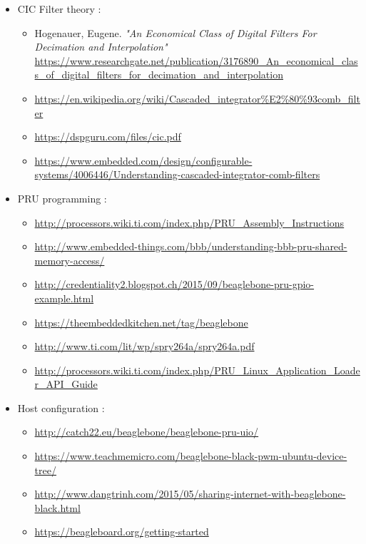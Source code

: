 \documentclass[]{report}
\providecommand{\tightlist}{%
	\setlength{\itemsep}{0pt}\setlength{\parskip}{0pt}}
\begin{document}
\begin{itemize}
\tightlist
\item
  CIC Filter theory :
  
  

  \begin{itemize}
  \tightlist
  \item
    Hogenauer, Eugene. \emph{"An Economical Class of Digital Filters
    For Decimation and Interpolation"} \url{https://www.researchgate.net/publication/3176890_An_economical_class_of_digital_filters_for_decimation_and_interpolation}
  \item
    \url{https://en.wikipedia.org/wiki/Cascaded_integrator%E2%80%93comb_filter}
  \item
    \url{https://dspguru.com/files/cic.pdf}
  \item
    \url{https://www.embedded.com/design/configurable-systems/4006446/Understanding-cascaded-integrator-comb-filters}
  \end{itemize}
\item
  PRU programming :

  \begin{itemize}
  \tightlist
  \item
    \url{http://processors.wiki.ti.com/index.php/PRU\_Assembly\_Instructions}
  \item
    \url{http://www.embedded-things.com/bbb/understanding-bbb-pru-shared-memory-access/}
  \item
    \url{http://credentiality2.blogspot.ch/2015/09/beaglebone-pru-gpio-example.html}
  \item
    \url{https://theembeddedkitchen.net/tag/beaglebone}
  \item
    \url{http://www.ti.com/lit/wp/spry264a/spry264a.pdf}
  \item
    \url{http://processors.wiki.ti.com/index.php/PRU\_Linux\_Application\_Loader\_API\_Guide}
  \end{itemize}
\item
  Host configuration :

  \begin{itemize}
  \tightlist
  \item
    \url{http://catch22.eu/beaglebone/beaglebone-pru-uio/}
  \item
    \url{https://www.teachmemicro.com/beaglebone-black-pwm-ubuntu-device-tree/}
  \item
    \url{http://www.dangtrinh.com/2015/05/sharing-internet-with-beaglebone-black.html}
  \item
    \url{https://beagleboard.org/getting-started}
  \end{itemize}
\end{itemize}
\end{document}
